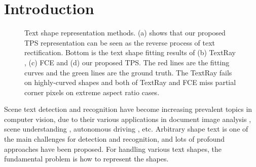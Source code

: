 \documentclass[sigconf]{acmart}
\begin{document}


\maketitle
	
	\section{Introduction}
	
	\begin{figure}[t]
		\centering
		\setlength{\abovecaptionskip}{5px}
		\subfigbottomskip=-4pt
		\subfigcapskip=-5pt
		\caption{Text shape representation methods. (a) shows that our proposed TPS representation can be seen as the reverse process of text rectification. Bottom is the text shape fitting results of (b) TextRay   \cite{Wang2020textray}, (c) FCE   \cite{zhu2021fourier} and (d) our proposed TPS. The red lines are the fitting curves and the green lines are the ground truth.
			The TextRay fails on highly-curved shapes and both of TextRay and FCE miss partial corner pixels on extreme aspect ratio cases.}
		\label{fig:intro}
		\vspace{-12px}
	\end{figure}
	
	Scene text detection and recognition have become increasing prevalent topics in computer vision, due to their various applications in document image analysis \cite{yang2017learning}, scene understanding \cite{zgy1}, autonomous driving \cite{zhu2017cascaded}, etc. Arbitrary shape text is one of the main challenges for detection and recognition, and lots of profound approaches have been proposed. For handling various text shapes, the fundamental problem is how to represent the shapes.
	
\end{document}
